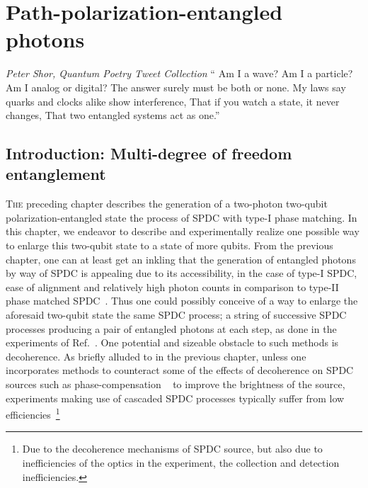 \chapter{Path-polarization-entangled photons}

\begin{epigram}{\textit{Peter Shor, Quantum Poetry Tweet Collection}}
	\enquote{
		Am I a wave? Am I a particle? Am I analog or digital?\newline
		The answer surely must be both or none.\newline
		My laws say quarks and clocks alike show interference,\newline
		That if you watch a state, it never changes,\newline
		That two entangled systems act as one.} 
\end{epigram}

\section{Introduction: Multi-degree of freedom entanglement}
\lettrine[lines=3]{T}{he} preceding chapter describes the generation of a two-photon two-qubit polarization-entangled state \via the process of \acs{SPDC} with type-I phase matching. In this chapter, we endeavor to describe and experimentally realize one possible way to enlarge this two-qubit state to a state of more qubits. From the previous chapter, one can at least get an inkling that the generation of entangled photons by way of \acs{SPDC} is appealing due to its accessibility, in the case of type-I \acs{SPDC}, ease of alignment and relatively high photon counts in comparison to type-II phase matched \acs{SPDC}~\cite{Kwiat_1999}. Thus one could possibly conceive of a way to enlarge the aforesaid two-qubit state \via the same \acs{SPDC} process; a string of successive \acs{SPDC} processes producing a pair of entangled photons at each step, as done in the experiments of Ref.~\cite{Lu_2006,Huang_2011,Wang_2016}. One potential and sizeable obstacle to such methods is decoherence. As briefly alluded to in the previous chapter, unless one incorporates methods to counteract some of the effects of decoherence on \acs{SPDC} sources such as phase-compensation ~\cite{Akselrod_2007,Rangarajan_2009} to improve the brightness of the source, experiments making use of cascaded \acs{SPDC} processes typically suffer from low efficiencies~\footnote{Due to the decoherence mechanisms of \acs{SPDC} source, but also due to inefficiencies of the optics in the experiment, \eg the collection and detection inefficiencies.}

